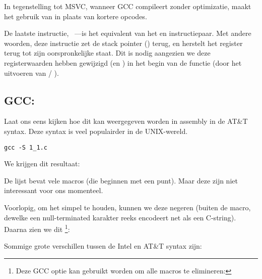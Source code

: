 \NLph{}

In tegenstelling tot MSVC, wanneer GCC compileert zonder optimizatie, maakt het gebruik van  in plaats van kortere opcodes.

De laatste instructie, \LEAVE~---is het equivalent van het  en  instructiepaar.
Met andere woorden, deze instructie zet de \gls{stack pointer} (\ESP) terug, en herstelt het \EBP register
terug tot zijn oorspronkelijke staat.
Dit is nodig aangezien we deze registerwaarden hebben gewijzigd (\ESP en \EBP) in het begin van de functie (door het uitvoeren van  / ).

\subsection{GCC: \ATTSyntax}
\label{ATT_syntax}

Laat ons eens kijken hoe dit kan weergegeven worden in assembly in de AT\&T syntax.
Deze syntax is veel populairder in de UNIX-wereld.

\begin{lstlisting}[caption=\NLph{} GCC 4.7.3]
gcc -S 1_1.c
\end{lstlisting}

We krijgen dit resultaat:



De lijst bevat vele macros (die beginnen met een punt). Maar deze zijn niet interessant voor ons momenteel.

Voorlopig, om het simpel te houden, kunnen we deze negeren (buiten de  macro, dewelke
een null-terminated karakter reeks encodeert net als een C-string). Daarna zien we dit
\footnote{Deze GCC optie kan gebruikt worden om alle  macros te elimineren: }:



\myindex{\ATTSyntax}
\myindex{\IntelSyntax}
Sommige grote verschillen tussen de Intel en AT\&T syntax zijn:

